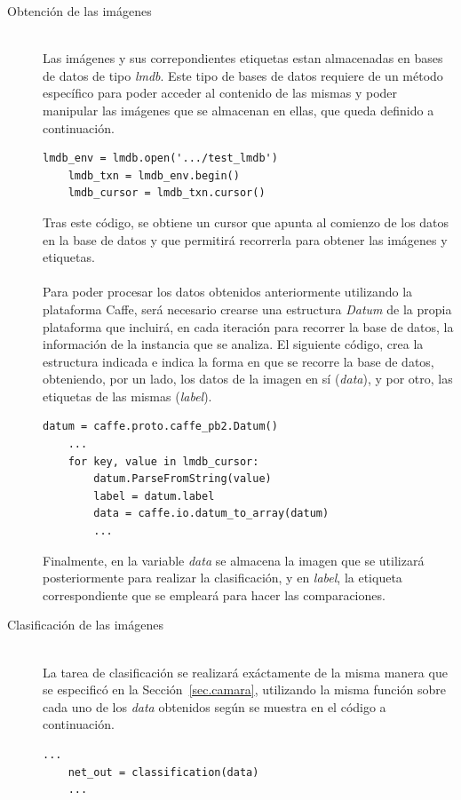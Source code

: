 \begin{description}
	\item[Obtención de las imágenes] \hfill 
	\vspace{5pt}
	\\
	Las imágenes y sus correpondientes etiquetas estan almacenadas en bases de datos de tipo \textit{\acrfull{lmdb}}. Este tipo de bases de datos requiere de un método específico para poder acceder al contenido de las mismas y poder manipular las imágenes que se almacenan en ellas, que queda definido a continuación.
	\vspace{10pt}
	\begin{lstlisting}[frame=single]
	lmdb_env = lmdb.open('.../test_lmdb')
	lmdb_txn = lmdb_env.begin()
	lmdb_cursor = lmdb_txn.cursor()
	\end{lstlisting}
	
	Tras este código, se obtiene un cursor que apunta al comienzo de los datos en la base de datos y que permitirá recorrerla para obtener las imágenes y etiquetas.\\
	\vspace{-10pt}
	\\
	Para poder procesar los datos obtenidos anteriormente utilizando la plataforma Caffe, será necesario crearse una estructura \textit{Datum} de la propia plataforma que incluirá, en cada iteración para recorrer la base de datos, la información de la instancia que se analiza. El siguiente código, crea la estructura indicada e indica la forma en que se recorre la base de datos, obteniendo, por un lado, los datos de la imagen en sí (\textit{data}), y por otro, las etiquetas de las mismas (\textit{label}).
	\vspace{10pt}
	\begin{lstlisting}[frame=single]
	datum = caffe.proto.caffe_pb2.Datum()
	...
	for key, value in lmdb_cursor:
		datum.ParseFromString(value)
		label = datum.label
		data = caffe.io.datum_to_array(datum)
		...
	\end{lstlisting}
	
	Finalmente, en la variable \textit{data} se almacena la imagen que se utilizará posteriormente para realizar la clasificación, y en \textit{label}, la etiqueta correspondiente que se empleará para hacer las comparaciones.
	\vspace{20pt}
	\item[Clasificación de las imágenes] \hfill 
	\vspace{5pt}
	\\
	La tarea de clasificación se realizará exáctamente de la misma manera que se especificó en la Sección~\ref{sec.camara}, utilizando la misma función sobre cada uno de los \textit{data} obtenidos según se muestra en el código a continuación.
	\vspace{25pt}
	\begin{lstlisting}[frame=single]
	...
	net_out = classification(data)
	...
	\end{lstlisting}
	

\end{description}
